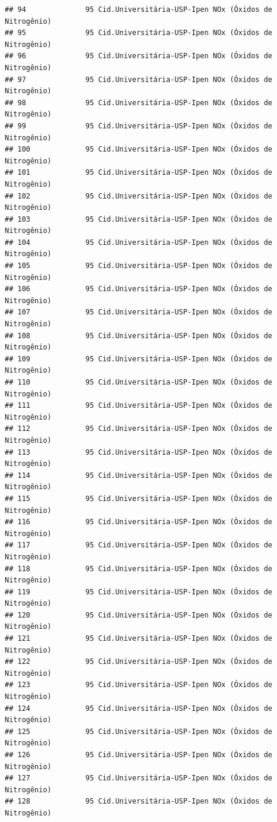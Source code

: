 \documentclass[]{book}
\begin{document}
\begin{verbatim}
## 94              95 Cid.Universitária-USP-Ipen NOx (Óxidos de Nitrogênio)
## 95              95 Cid.Universitária-USP-Ipen NOx (Óxidos de Nitrogênio)
## 96              95 Cid.Universitária-USP-Ipen NOx (Óxidos de Nitrogênio)
## 97              95 Cid.Universitária-USP-Ipen NOx (Óxidos de Nitrogênio)
## 98              95 Cid.Universitária-USP-Ipen NOx (Óxidos de Nitrogênio)
## 99              95 Cid.Universitária-USP-Ipen NOx (Óxidos de Nitrogênio)
## 100             95 Cid.Universitária-USP-Ipen NOx (Óxidos de Nitrogênio)
## 101             95 Cid.Universitária-USP-Ipen NOx (Óxidos de Nitrogênio)
## 102             95 Cid.Universitária-USP-Ipen NOx (Óxidos de Nitrogênio)
## 103             95 Cid.Universitária-USP-Ipen NOx (Óxidos de Nitrogênio)
## 104             95 Cid.Universitária-USP-Ipen NOx (Óxidos de Nitrogênio)
## 105             95 Cid.Universitária-USP-Ipen NOx (Óxidos de Nitrogênio)
## 106             95 Cid.Universitária-USP-Ipen NOx (Óxidos de Nitrogênio)
## 107             95 Cid.Universitária-USP-Ipen NOx (Óxidos de Nitrogênio)
## 108             95 Cid.Universitária-USP-Ipen NOx (Óxidos de Nitrogênio)
## 109             95 Cid.Universitária-USP-Ipen NOx (Óxidos de Nitrogênio)
## 110             95 Cid.Universitária-USP-Ipen NOx (Óxidos de Nitrogênio)
## 111             95 Cid.Universitária-USP-Ipen NOx (Óxidos de Nitrogênio)
## 112             95 Cid.Universitária-USP-Ipen NOx (Óxidos de Nitrogênio)
## 113             95 Cid.Universitária-USP-Ipen NOx (Óxidos de Nitrogênio)
## 114             95 Cid.Universitária-USP-Ipen NOx (Óxidos de Nitrogênio)
## 115             95 Cid.Universitária-USP-Ipen NOx (Óxidos de Nitrogênio)
## 116             95 Cid.Universitária-USP-Ipen NOx (Óxidos de Nitrogênio)
## 117             95 Cid.Universitária-USP-Ipen NOx (Óxidos de Nitrogênio)
## 118             95 Cid.Universitária-USP-Ipen NOx (Óxidos de Nitrogênio)
## 119             95 Cid.Universitária-USP-Ipen NOx (Óxidos de Nitrogênio)
## 120             95 Cid.Universitária-USP-Ipen NOx (Óxidos de Nitrogênio)
## 121             95 Cid.Universitária-USP-Ipen NOx (Óxidos de Nitrogênio)
## 122             95 Cid.Universitária-USP-Ipen NOx (Óxidos de Nitrogênio)
## 123             95 Cid.Universitária-USP-Ipen NOx (Óxidos de Nitrogênio)
## 124             95 Cid.Universitária-USP-Ipen NOx (Óxidos de Nitrogênio)
## 125             95 Cid.Universitária-USP-Ipen NOx (Óxidos de Nitrogênio)
## 126             95 Cid.Universitária-USP-Ipen NOx (Óxidos de Nitrogênio)
## 127             95 Cid.Universitária-USP-Ipen NOx (Óxidos de Nitrogênio)
## 128             95 Cid.Universitária-USP-Ipen NOx (Óxidos de Nitrogênio)

\end{verbatim}
\end{document}

